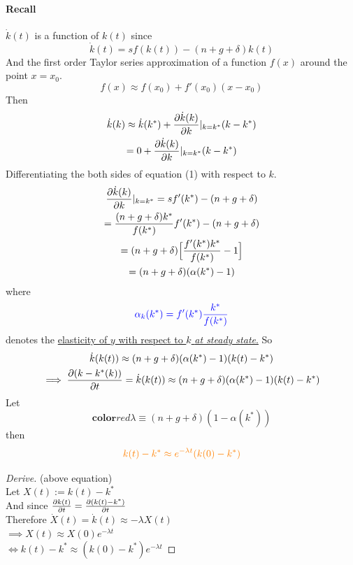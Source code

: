 \documentclass[11pt]{article}
\begin{document}
	    \paragraph{Recall} $\dot{k}(t)$ is a function of $k(t)$ since 
	    \begin{equation}
	        \dot{k}(t) = sf(k(t)) - (n+g+\delta)k(t)
	    \end{equation}
	    And the first order Taylor series approximation of a function $f(x)$ around the point $x = x_0$.
	    \[
	        f(x) \approx f(x_0) + f'(x_0)(x - x_0)
	    \]
	    Then
	    \begin{gather*}
	        \dot{k}(k) \approx \dot{k}(k^*) + \frac{\partial{\dot{k}(k)}}{\partial{k}}|_{k=k^*} (k - k^*) \\
	        = 0 + \frac{\partial{\dot{k}(k)}}{\partial{k}}|_{k=k^*} (k - k^*)
	    \end{gather*}
	    Differentiating the both sides of equation (1) with respect to $k$.
	    \begin{gather*}
	        \frac{\partial{\dot{k}(k)}}{\partial{k}}|_{k=k^*} = sf'(k^*) - (n + g + \delta) \\
	        = \frac{(n + g + \delta) k^*}{f(k^*)} f'(k^*) - (n + g + \delta) \\
	        = (n + g + \delta) \Big [
	            \frac{f'(k^*) k^*}{f(k^*)} - 1
	            \Big ] \\
	        = (n + g + \delta) (\alpha (k^*) - 1)
	    \end{gather*}
	    where 
	    \begin{equation}
	    \textcolor{blue}{
	        \alpha_k (k^*) = f'(k^*)\frac{k^*}{f(k^*)}
	        }
	    \end{equation}
	    denotes the \ul{elasticity of $y$ with respect to $k$ \emph{at steady state}.}
	    So
	    \begin{gather*}
	        \dot{k}(k(t)) \approx (n + g + \delta) (\alpha (k^*) - 1) (k(t) - k^*) \\
	        \implies \frac{\partial{({k - k^*}(k))}}{\partial{t}} = \dot{k}(k(t)) \approx (n + g + \delta) (\alpha (k^*) - 1) (k(t) - k^*)
	    \end{gather*}
	    Let 
	    \begin{equation}
	    		\textbf{color}{red}{
	    		\lambda \equiv (n + g + \delta) (1 - \alpha (k^*))
	    		}
	    \end{equation}
		then 
	    \begin{gather}
	    \textcolor{orange}{
	        k(t) - k^* \approx e^{-\lambda t}(k(0) - k^*)
	    }
	    \end{gather}
	    \begin{remark}
		    \begin{proof}[Derive] (above equation)\\
		        Let $X(t) := k(t) - k^*$ \\
		        And since $\frac{\partial{k(t)}}{\partial{t}} = \frac{\partial{(k(t) - k^*)}}{\partial{t}}$ \\
		        Therefore $\dot{X}(t) = \dot{k}(t) \approx -\lambda X(t)$ \\
		        $\implies X(t) \approx X(0) e^{-\lambda t}$ \\
		        $\iff k(t) - k^* \approx (k(0) - k^*) e^{-\lambda t}$
		    \end{proof}
	    \end{remark}
\end{document}

